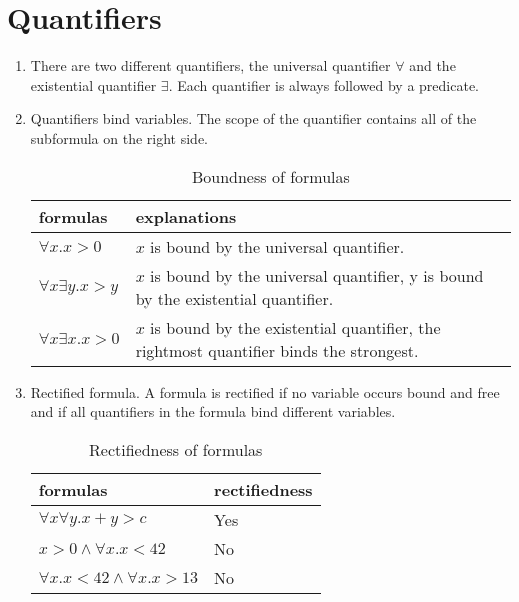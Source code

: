 \documentclass[12pt]{article}
\begin{document}
\section*{Quantifiers}
\begin{enumerate}
    \item There are two different quantifiers, the universal quantifier $\forall$ and the existential quantifier $\exists$.
    Each quantifier is always followed by a predicate.
    \item Quantifiers bind variables. The scope of the quantifier contains all of the subformula on the right side.
    \begin{table}[ht]
        \centering 
        \begin{tabular}{|| p{2.5cm} | p{8cm} ||}
            \hline 
            formulas & explanations \\
            \hline \hline
            $\forall x. x > 0$ & $x$ is bound by the universal quantifier. \\
            \hline 
            $\forall x \exists y. x > y$ & $x$ is bound by the universal quantifier, 
              y is bound by the existential quantifier.\\
            \hline
            $\forall x \exists x. x > 0$ & $x$ is bound by the existential quantifier, 
            the rightmost quantifier binds the strongest.\\
            \hline 
        \end{tabular}
        \caption[Table 2]{Boundness of formulas}
    \end{table}
    \item Rectified formula. A formula is rectified if no variable occurs bound and free and if all quantifiers
    in the formula bind different variables. 
    \begin{table}[ht]
        \centering 
        \begin{tabular}{|| p{5cm} | p{2.5cm} ||}
            \hline 
            formulas & rectifiedness \\
            \hline \hline
            $\forall x \forall y. x + y > c$ & Yes \\
            \hline 
            $x > 0 \land \forall x . x < 42 $ & No \\
            \hline
            $\forall x. x < 42 \land \forall x. x > 13$ & No\\
            \hline 
        \end{tabular}
        \caption[Table 2]{Rectifiedness of formulas}
    \end{table}

\end{enumerate}
\end{document}
